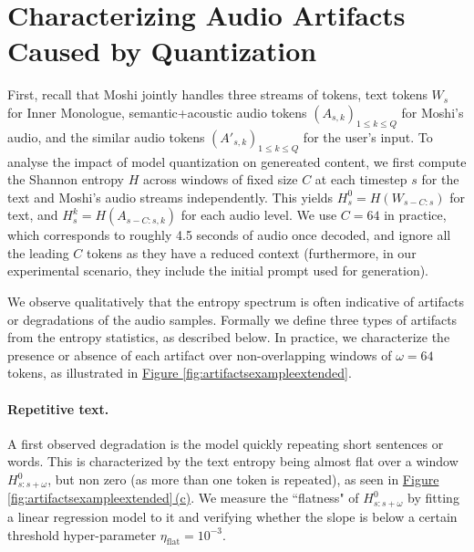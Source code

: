 \section{Characterizing Audio Artifacts Caused by Quantization}
\label{app:artifactsmetric}

First, recall that Moshi jointly handles three streams of tokens, text tokens $W_{s}$ for Inner Monologue, semantic+acoustic audio tokens $(A_{s, k})_{1 \leq k \leq Q}$ for Moshi's audio, and the similar audio tokens $(A'_{s, k})_{1 \leq k \leq Q}$ for the user's input. 
To analyse the impact of model quantization on genereated content, we first compute the Shannon entropy $H$ across windows of fixed size $C$ at each timestep $s$ for the 
text and Moshi's audio streams independently. This yields $H^{0}_s = H(W_{s-C:s})$ for text, and $H^{k}_s = H(A_{s-C:s, k})$ for each audio level. 
We use  $C = 64$ in practice, which corresponds to roughly 4.5 seconds of audio once decoded, and ignore all the leading $C$ tokens as they have a reduced context (furthermore, in our experimental scenario, they include the initial  prompt used for generation).

We observe qualitatively that the entropy spectrum is often indicative of artifacts or degradations of the audio samples. 
Formally we define three types of  artifacts from the entropy statistics, as described below. In practice, we characterize the presence or absence of each artifact over non-overlapping windows of  $\omega = 64$ tokens, as illustrated in \hyperref[fig:artifactsexampleextended]{Figure \ref{fig:artifactsexampleextended}}. 
\paragraph{Repetitive text.}
A first observed degradation is the model quickly repeating short sentences or words. This is characterized by the text entropy being almost flat over a window $H^0_{s:s+\omega}$, but non zero (as more than one token is repeated), as seen in  \hyperref[fig:artifactsexampleextended]{Figure \ref{fig:artifactsexampleextended}\,(c)}. We measure the ``flatness" of $H^0_{s:s+\omega}$ by fitting a linear regression model to it and verifying whether the slope is below a certain threshold hyper-parameter $\eta_\text{flat} = 10^{-3}$.
